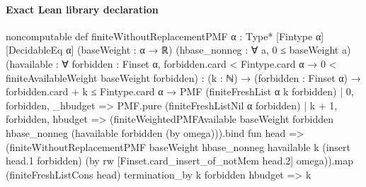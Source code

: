 \documentclass[10pt]{article}
\begin{document}
\paragraph{Exact Lean library declaration}
\begin{ReviewVerbatim}
noncomputable def finiteWithoutReplacementPMF
    {α : Type*} [Fintype α] [DecidableEq α]
    (baseWeight : α → ℝ)
    (hbase_nonneg : ∀ a, 0 ≤ baseWeight a)
    (havailable : ∀ forbidden : Finset α,
      forbidden.card < Fintype.card α →
        0 < finiteAvailableWeight baseWeight forbidden) :
    (k : ℕ) → (forbidden : Finset α) →
      forbidden.card + k ≤ Fintype.card α →
        PMF (finiteFreshList α k forbidden)
  | 0, forbidden, _hbudget => PMF.pure (finiteFreshListNil α forbidden)
  | k + 1, forbidden, hbudget =>
      (finiteWeightedPMFAvailable
        baseWeight forbidden hbase_nonneg
        (havailable forbidden (by omega))).bind fun head =>
        (finiteWithoutReplacementPMF
          baseWeight hbase_nonneg havailable
          k (insert head.1 forbidden)
          (by
            rw [Finset.card_insert_of_notMem head.2]
            omega)).map (finiteFreshListCons head)
termination_by k forbidden hbudget => k


\end{ReviewVerbatim}
\end{document}
